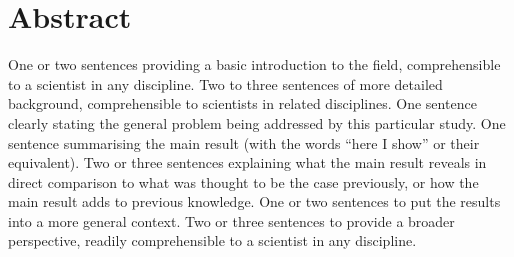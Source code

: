 \chapter*{\Large \center Abstract}


One or two sentences providing a basic introduction to the field, comprehensible to a scientist in any discipline.  Two to three sentences of more detailed background, comprehensible to scientists in related disciplines.  One sentence clearly stating the general problem being addressed by this particular study.  One sentence summarising the main result (with the words ``here I show'' or their equivalent).  Two or three sentences explaining what the main result reveals in direct comparison to what was thought to be the case previously, or how the main result adds to previous knowledge.  One or two sentences to put the results into a more general context.  Two or three sentences to provide a broader perspective, readily comprehensible to a scientist in any discipline.